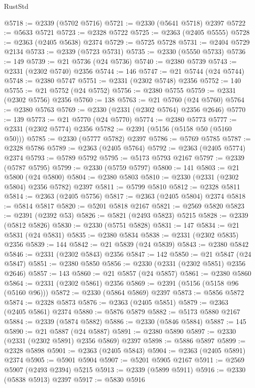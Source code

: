 \begin{lexlean}{RustStd}
\begin{coremodule}
@5718 := @2339 (@5702 @5716)
@5721 := @2330 (@5641 @5718) @2397
@5722 := @5633 @5721
@5723 := @2328 @5722
@5725 := @2363 (@2405 @5555)
@5728 := @2363 (@2405 @5638) @2374
@5729 := @5725 @5728
@5731 := @2404 @5729 @2134
@5733 := @2339 (@5723 @5731)
@5735 := @2330 (@5550 @5733)
@5736 := 149
@5739 := @21 @5736 (@24 @5736)
@5740 := @2380 @5739
@5743 := @2331 (@2302 @5740) @2356
@5744 := 146
@5747 := @21 @5744 (@24 @5744)
@5748 := @2380 @5747
@5751 := @2331 (@2302 @5748) @2356
@5752 := 140
@5755 := @21 @5752 (@24 @5752)
@5756 := @2380 @5755
@5759 := @2331 (@2302 @5756) @2356
@5760 := 138
@5763 := @21 @5760 (@24 @5760)
@5764 := @2380 @5763
@5769 := @2330 (@2331 (@2302 @5764) @2356 @2646)
@5770 := 139
@5773 := @21 @5770 (@24 @5770)
@5774 := @2380 @5773
@5777 := @2331 (@2302 @5774) @2356
@5782 := @2391 (@5156 (@5158 @50 (@5160 @50)))
@5785 := @2330 (@5777 @5782) @2397
@5786 := @5769 @5785
@5787 := @2328 @5786
@5789 := @2363 (@2405 @5764)
@5792 := @2363 (@2405 @5774) @2374
@5793 := @5789 @5792
@5795 := @5173 @5793 @2167
@5797 := @2339 (@5787 @5795)
@5799 := @2330 (@5759 @5797)
@5800 := 141
@5803 := @21 @5800 (@24 @5800)
@5804 := @2380 @5803
@5810 := @2330 (@2331 (@2302 @5804) @2356 @5782) @2397
@5811 := @5799 @5810
@5812 := @2328 @5811
@5814 := @2363 (@2405 @5756)
@5817 := @2363 (@2405 @5804) @2374
@5818 := @5814 @5817
@5820 := @5201 @5818 @2167
@5821 := @2569 @5820
@5823 := @2391 (@2392 @53)
@5826 := @5821 (@2493 @5823) @5215
@5828 := @2339 (@5812 @5826)
@5830 := @2330 (@5751 @5828)
@5831 := 147
@5834 := @21 @5831 (@24 @5831)
@5835 := @2380 @5834
@5838 := @2331 (@2302 @5835) @2356
@5839 := 144
@5842 := @21 @5839 (@24 @5839)
@5843 := @2380 @5842
@5846 := @2331 (@2302 @5843) @2356
@5847 := 142
@5850 := @21 @5847 (@24 @5847)
@5851 := @2380 @5850
@5856 := @2330 (@2331 (@2302 @5851) @2356 @2646)
@5857 := 143
@5860 := @21 @5857 (@24 @5857)
@5861 := @2380 @5860
@5864 := @2331 (@2302 @5861) @2356
@5869 := @2391 (@5156 (@5158 @96 (@5160 @96)))
@5872 := @2330 (@5864 @5869) @2397
@5873 := @5856 @5872
@5874 := @2328 @5873
@5876 := @2363 (@2405 @5851)
@5879 := @2363 (@2405 @5861) @2374
@5880 := @5876 @5879
@5882 := @5173 @5880 @2167
@5884 := @2339 (@5874 @5882)
@5886 := @2330 (@5846 @5884)
@5887 := 145
@5890 := @21 @5887 (@24 @5887)
@5891 := @2380 @5890
@5897 := @2330 (@2331 (@2302 @5891) @2356 @5869) @2397
@5898 := @5886 @5897
@5899 := @2328 @5898
@5901 := @2363 (@2405 @5843)
@5904 := @2363 (@2405 @5891) @2374
@5905 := @5901 @5904
@5907 := @5201 @5905 @2167
@5911 := @2569 @5907 (@2493 @2394) @5215
@5913 := @2339 (@5899 @5911)
@5916 := @2330 (@5838 @5913) @2397
@5917 := @5830 @5916

\end{coremodule}
\end{lexlean}
